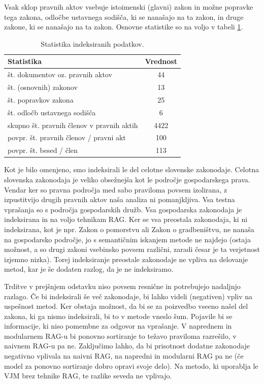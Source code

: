\documentclass[a4paper,12pt,openright]{book}
\begin{document}
Vsak sklop pravnih aktov vsebuje istoimenski (glavni) zakon in možne popravke tega zakona, odločbe ustavnega sodišča, ki se nanašajo na ta zakon, in druge zakone, ki se nanašajo na ta zakon. Osnovne statistike so na voljo v tabeli \ref{statistika}.
\begin{table}[htbp]
	\centering
	\begin{tabular}{|l|c|}
		\hline
		Statistika                                & Vrednost \\ \hline
		št. dokumentov oz. pravnih aktov          & 44       \\ \hline
		št. (osnovnih) zakonov                    & 13       \\ \hline
		št. popravkov zakona                      & 25       \\ \hline
		št. odločb ustavnega sodišča              & 6        \\ \hline
		skupno št. pravnih členov v pravnih aktih & 4422     \\ \hline
		povpr. št. pravnih členov / pravni akt    & 100      \\ \hline
		povpr. št. besed / člen                   & 113      \\ \hline
	\end{tabular}
	\caption{Statistika indeksiranih podatkov.}
	\label{statistika}
\end{table}

Kot je bilo omenjeno, smo indeksirali le del celotne slovenske zakonodaje. Celotna slovenska zakonodaja je veliko obsežnejša kot le področje gospodarskega prava. Vendar ker so pravna področja med sabo praviloma povsem izolirana, z izpustitvijo drugih pravnih aktov naša analiza ni pomanjkljiva. Vsa testna vprašanja so s področja gospodarskih družb. Vsa gospodarska zakonodaja je indeksirana in na voljo tehnikam RAG. Ker se vsa preostala zakonodaja, ki ni indeksirana, kot je npr. Zakon o pomorstvu ali Zakon o gradbeništvu, ne nanaša na gospodarsko področje, jo s semantičnim iskanjem metode ne najdejo (ostaja možnost, a so drugi zakoni vsebinsko povsem različni, zaradi česar je ta verjetnost izjemno nizka). Torej indeksiranje preostale zakonodaje ne vpliva na delovanje metod, kar je še dodaten razlog, da je ne indeksiramo.

Trditve v prejšnjem odstavku niso povsem resnične in potrebujejo nadaljnjo razlago. Če bi indeksirali še več zakonodaje, bi lahko videli (negativen) vpliv na uspešnost metod. Ker obstaja možnost, da bi se za poizvedbo vseeno našel del zakona, ki ga nismo indeksirali, bi to v metode vneslo šum. Pojavile bi se informacije, ki niso pomembne za odgovor na vprašanje. V naprednem in modularnem RAG-u bi ponovno sortiranje to težavo praviloma razrešilo, v naivnem RAG-u pa ne. Zaključimo lahko, da bi prisotnost dodatne zakonodaje negativno vplivala na naivni RAG, na napredni in modularni RAG pa ne (če model za ponovno sortiranje dobro opravi svoje delo). Na metodo, ki uporablja le VJM brez tehnike RAG, te razlike seveda ne vplivajo.
\end{document}
